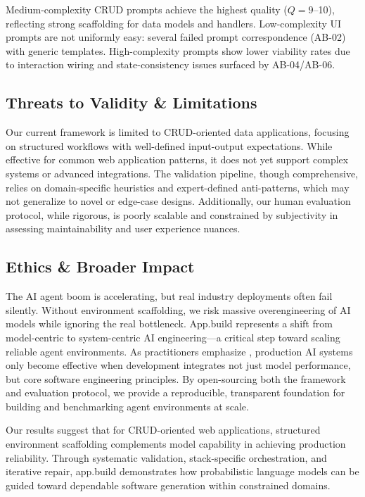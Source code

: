 \documentclass[conference]{IEEEtran}
\begin{document}
Medium-complexity CRUD prompts achieve the highest quality ($Q=9$--10), reflecting strong scaffolding for data models and handlers. Low-complexity UI prompts are not uniformly easy: several failed prompt correspondence (AB-02) with generic templates. High-complexity prompts show lower viability rates due to interaction wiring and state-consistency issues surfaced by AB-04/AB-06.

\subsection{Threats to Validity \& Limitations}
\label{sec:limitations}

Our current framework is limited to CRUD-oriented data applications, focusing on structured workflows with well-defined input-output expectations. While effective for common web application patterns, it does not yet support complex systems or advanced integrations. The validation pipeline, though comprehensive, relies on domain-specific heuristics and expert-defined anti-patterns, which may not generalize to novel or edge-case designs. Additionally, our human evaluation protocol, while rigorous, is poorly scalable and constrained by subjectivity in assessing maintainability and user experience nuances.

\subsection{Ethics \& Broader Impact}
\label{sec:broader-impact}

The AI agent boom is accelerating, but real industry deployments often fail silently. Without environment scaffolding, we risk massive overengineering of AI models while ignoring the real bottleneck. App.build represents a shift from model-centric to system-centric AI engineering—a critical step toward scaling reliable agent environments. As practitioners emphasize \cite{babushkin2025machine}, production AI systems only become effective when development integrates not just model performance, but core software engineering principles. By open-sourcing both the framework and evaluation protocol, we provide a reproducible, transparent foundation for building and benchmarking agent environments at scale.

Our results suggest that for CRUD-oriented web applications, structured environment scaffolding complements model capability in achieving production reliability. Through systematic validation, stack-specific orchestration, and iterative repair, app.build demonstrates how probabilistic language models can be guided toward dependable software generation within constrained domains.
\end{document}
